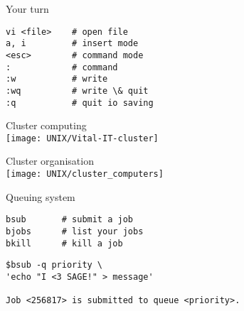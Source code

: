 \documentclass[xcolor=dvipsnames]{beamer}
\begin{document}
\begin{frame}[fragile]
\begin{center}
	\Huge
	Your turn
\end{center}
\Large
\begin{verbatim}
vi <file>    # open file
a, i         # insert mode
<esc>        # command mode
:            # command
:w           # write
:wq          # write \& quit
:q           # quit io saving
\end{verbatim}
\end{frame}

\begin{frame}
	\begin{center}
		\Huge
		Cluster computing\\
		\vspace{1cm}
		\texttt{[image: UNIX/Vital-IT-cluster]}
	\end{center}
\end{frame}	

\begin{frame}
	\begin{center}
		\Huge
		Cluster organisation\\
		\vspace{1cm}
		\texttt{[image: UNIX/cluster\_computers]}
	\end{center}
\end{frame}

\begin{frame}
	\begin{center}
		\Huge
		Queuing system\\
		\vspace{1cm}

	\end{center}
\end{frame}

\begin{frame}[fragile]
\huge
\begin{verbatim}
bsub       # submit a job
bjobs      # list your jobs
bkill      # kill a job
\end{verbatim}
\end{frame}

\begin{frame}[fragile]
\large
\begin{verbatim}
$bsub -q priority \
'echo "I <3 SAGE!" > message'

Job <256817> is submitted to queue <priority>.
\end{verbatim}
\end{frame}
\end{document}
